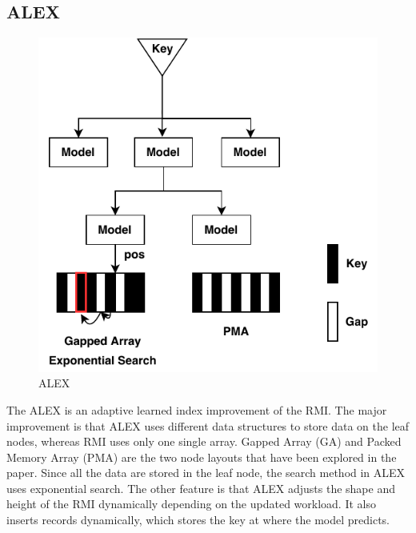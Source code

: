 \subsection{ALEX}

\begin{figure}[ht]
\centering
\includegraphics[scale=1]{Figures/alex.pdf}
\caption{ALEX}
\label{fig:alex}
\end{figure}

The ALEX \cite{Ding:2020wo} is an adaptive learned index improvement of the RMI. The major improvement is that ALEX uses different data structures to store data on the leaf nodes, whereas RMI uses only one single array. Gapped Array (GA) and Packed Memory Array (PMA) are the two node layouts that have been explored in the paper. Since all the data are stored in the leaf node, the search method in ALEX uses exponential search. The other feature is that ALEX adjusts the shape and height of the RMI dynamically depending on the updated workload. It also inserts records dynamically, which stores the key at where the model predicts. 


